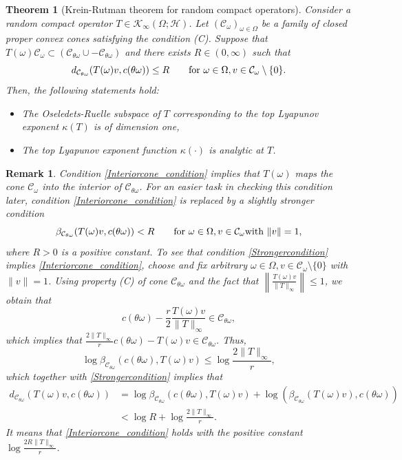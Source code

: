 \documentclass[pdflatex,sn-mathphys-num]{sn-jnl}%
\theoremstyle{thmstyleone}%
\newtheorem{theorem}{Theorem}%
\theoremstyle{thmstyletwo}%
\newtheorem{remark}{Remark}
\theoremstyle{thmstylethree}%
\newcommand{\cC}{\mathcal{C}}
\numberwithin{equation}{section}
\begin{document}
%
\begin{theorem}[Krein-Rutman theorem for random compact  operators]\label{Krein-Rutman}
Consider a random compact operator $T\in \mathcal K_{\infty}(\Omega;\mathcal H)$. Let  $(\mathcal C_{\omega})_{\omega\in \Omega}$ be a family of closed proper convex cones satisfying the condition (C). Suppose that $T(\omega)\mathcal C_{\omega}\subset \left(\mathcal C_{\theta \omega}\cup -\mathcal C_{\theta \omega}\right)$ and there exists $R\in (0,\infty)$ such that
\begin{equation}\label{Interiorcone_condition}
d_{\mathcal C_{\theta\omega}}(T(\omega)v, c(\theta\omega))\leq R\qquad\hbox{for } \omega\in \Omega, v\in \mathcal C_{\omega}\setminus\{0\}.
\end{equation}
Then, the following statements hold:
\begin{itemize}
\item [(i)] The Oseledets-Ruelle subspace of $T$ corresponding to the top Lyapunov exponent $\kappa(T)$ is of dimension one,
\item [(ii)] The top Lyapunov exponent function $\kappa(\cdot)$ is analytic at $T$.
\end{itemize}
\end{theorem}
%
%
%
\begin{remark}\label{Explaination_interiorcone}
 Condition \eqref{Interiorcone_condition} implies that $T(\omega)$ maps the cone $\cC_{\omega}$ into the interior of $\cC_{\theta\omega}$. For an easier task in checking this condition later, condition \eqref{Interiorcone_condition} is replaced by a slightly stronger condition
\begin{equation}\label{Strongercondition}
\beta_{\mathcal C_{\theta\omega}}(T(\omega)v, c(\theta\omega))< R \qquad\hbox{for } \omega\in \Omega, v\in \mathcal C_{\omega} \hbox{with } \|v\|=1,   
\end{equation}
where $R>0$ is a positive constant. To see that condition \eqref{Strongercondition} implies \eqref{Interiorcone_condition}, choose and fix  arbitrary $\omega\in \Omega, v\in \mathcal C_{\omega}\setminus\{0\}$ with  $\|v\|=1$. Using property (C) of cone $\cC_{\theta\omega}$ and the fact that $\left\|\frac{T(\omega)v}{\|T\|_{\infty}}\right\|\leq 1$, we obtain that \[
c(\theta\omega)-\frac{r}{2}\frac{T(\omega)v}{\|T\|_{\infty}}\in \cC_{\theta\omega},
\]
which implies that $\frac{2\|T\|_{\infty}}{r}c(\theta\omega)-T(\omega)v\in \cC_{\theta\omega}$. Thus, 
\begin{equation}\label{InteriorCone_02}
\log\beta_{\mathcal C_{\theta\omega}}(c(\theta\omega),T(\omega)v)
\leq 
\log \frac{2\|T\|_{\infty}}{r},
\end{equation}
which together with \eqref{Strongercondition} implies that 
\begin{align*}
d_{\cC_{\theta\omega}}
(T(\omega)v, c(\theta\omega))
&= \log \beta_{\mathcal C_{\theta\omega}}(c(\theta\omega),T(\omega)v) + \log (\beta_{\mathcal C_{\theta\omega}}(T(\omega)v), c(\theta\omega))\\
&< 
\log R+ \log  \frac{2\|T\|_{\infty}}{r}.
\end{align*}
It means that \eqref{Interiorcone_condition} holds with the positive constant $\log \frac{2R\|T\|_{\infty}}{r}$.
\end{remark}
\end{document}
